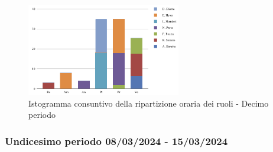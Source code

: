 \begin{figure}[H]
    \centering
    \includegraphics[width=0.6\textwidth]{../Images/graficoConsPrev10.png}
    \caption{Istogramma consuntivo della ripartizione oraria dei ruoli - Decimo periodo}
    \label{fig:Consuntivo_ripartizione_oraria_10}
\end{figure}


\subsubsection{Undicesimo periodo  08/03/2024 - 15/03/2024}

